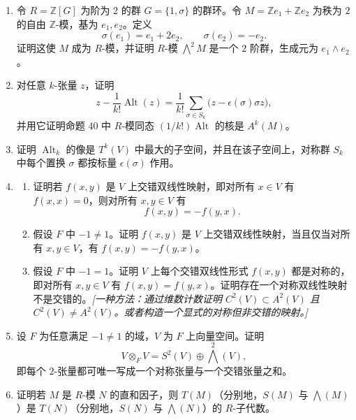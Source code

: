 \begin{enumerate}[label=\arabic*.]
\begin{enumerate}[label=(\alph*)]
\item 给出一个整环 $R$ 以及 $F$ 中的一个 $R$-模 $I$，使得对每个 $i\geq0$ 都有 $\bigwedge^i I\neq0$。\emph{[参见推论 37 后的例子。]}
\end{enumerate}
\item 令 $R=\mathbb Z[G]$ 为阶为 $2$ 的群 $G=\{1,\sigma\}$ 的群环。令 $M=\mathbb Ze_1+\mathbb Ze_2$ 为秩为 $2$ 的自由 $\mathbb Z$-模，基为 $e_1,e_2$。定义
\[
\sigma(e_1)=e_1+2e_2,
\qquad
\sigma(e_2)=-e_2.
\]
证明这使 $M$ 成为 $R$-模，并证明 $R$-模 $\bigwedge^2M$ 是一个 $2$ 阶群，生成元为 $e_1\wedge e_2$。
\item 对任意 $k$-张量 $z$，证明
\[
z-\frac1{k!}\operatorname{Alt}(z)
=
\frac1{k!}\sum_{\sigma\in S_k}\bigl(z-\epsilon(\sigma)\sigma z\bigr),
\]
并用它证明命题 40 中 $R$-模同态 $(1/k!)\operatorname{Alt}$ 的核是 $A^k(M)$。
\item 证明 $\operatorname{Alt}_k$ 的像是 $T^k(V)$ 中最大的子空间，并且在该子空间上，对称群 $S_k$ 中每个置换 $\sigma$ 都按标量 $\epsilon(\sigma)$ 作用。
\item 
\begin{enumerate}[label=(\alph*)]
\item 证明若 $f(x,y)$ 是 $V$ 上交错双线性映射，即对所有 $x\in V$ 有 $f(x,x)=0$，则对所有 $x,y\in V$ 有
\[
f(x,y)=-f(y,x).
\]
\item 假设 $F$ 中 $-1\neq1$。证明 $f(x,y)$ 是 $V$ 上交错双线性映射，当且仅当对所有 $x,y\in V$，有 $f(x,y)=-f(y,x)$。
\item 假设 $F$ 中 $-1=1$。证明 $V$ 上每个交错双线性形式 $f(x,y)$ 都是对称的，即对所有 $x,y\in V$ 有 $f(x,y)=f(y,x)$。证明存在一个对称双线性映射不是交错的。\emph{[一种方法：通过维数计数证明 $C^2(V)\subset A^2(V)$ 且 $C^2(V)\neq A^2(V)$。或者构造一个显式的对称但非交错的映射。]}
\end{enumerate}
\item 设 $F$ 为任意满足 $-1\neq1$ 的域，$V$ 为 $F$ 上向量空间。证明
\[
V\otimes_F V=S^2(V)\oplus\bigwedge^2(V),
\]
即每个 $2$-张量都可唯一写成一个对称张量与一个交错张量之和。
\item 证明若 $M$ 是 $R$-模 $N$ 的直和因子，则 $T(M)$（分别地，$S(M)$ 与 $\bigwedge(M)$）是 $T(N)$（分别地，$S(N)$ 与 $\bigwedge(N)$）的 $R$-子代数。
\end{enumerate}

